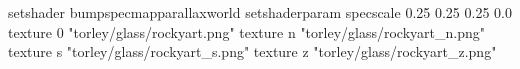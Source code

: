 setshader bumpspecmapparallaxworld
setshaderparam specscale 0.25 0.25 0.25 0.0
texture 0 "torley/glass/rockyart.png"
texture n "torley/glass/rockyart_n.png"
texture s "torley/glass/rockyart_s.png"
texture z "torley/glass/rockyart_z.png"

